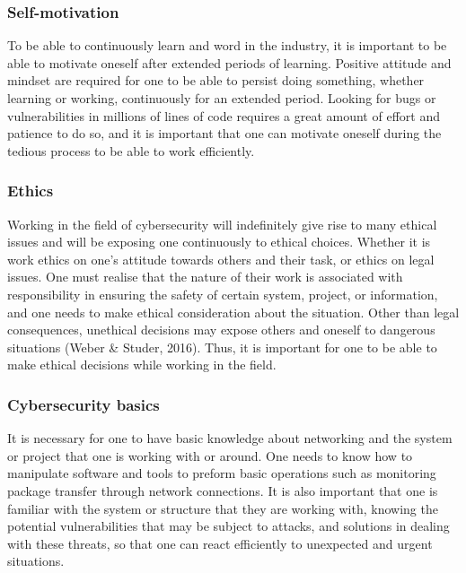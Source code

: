 \documentclass[a4paper, 11pt]{report}
\begin{document}
\subsubsection{Self-motivation}
To be able to continuously learn and word in the industry, it is important to be able to motivate oneself after extended periods of learning. Positive attitude and mindset are required for one to be able to persist doing something, whether learning or working, continuously for an extended period. Looking for bugs or vulnerabilities in millions of lines of code requires a great amount of effort and patience to do so, and it is important that one can motivate oneself during the tedious process to be able to work efficiently.  
\subsubsection{Ethics}
Working in the field of cybersecurity will indefinitely give rise to many ethical issues and will be exposing one continuously to ethical choices. Whether it is work ethics on one’s attitude towards others and their task, or ethics on legal issues. One must realise that the nature of their work is associated with responsibility in ensuring the safety of certain system, project, or information, and one needs to make ethical consideration about the situation. Other than legal consequences, unethical decisions may expose others and oneself to dangerous situations (Weber & Studer, 2016). Thus, it is important for one to be able to make ethical decisions while working in the field.  
\subsubsection{Cybersecurity basics}
It is necessary for one to have basic knowledge about networking and the system or project that one is working with or around. One needs to know how to manipulate software and tools to preform basic operations such as monitoring package transfer through network connections. It is also important that one is familiar with the system or structure that they are working with, knowing the potential vulnerabilities that may be subject to attacks, and solutions in dealing with these threats, so that one can react efficiently to unexpected and urgent situations.  
\end{document}
